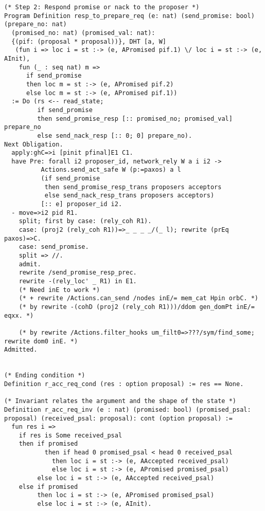 \begin{landscape}
\begin{multicols*}{2}
\begin{lstlisting}[style=SourceCodeListing]
(* Step 2: Respond promise or nack to the proposer *)
Program Definition resp_to_prepare_req (e: nat) (send_promise: bool) (prepare_no: nat)
  (promised_no: nat) (promised_val: nat):
  {(pif: (proposal * proposal))}, DHT [a, W]
   (fun i => loc i = st :-> (e, APromised pif.1) \/ loc i = st :-> (e, AInit),
    fun (_ : seq nat) m =>
      if send_promise
      then loc m = st :-> (e, APromised pif.2)
      else loc m = st :-> (e, APromised pif.1))
  := Do (rs <-- read_state;
         if send_promise
         then send_promise_resp [:: promised_no; promised_val] prepare_no
         else send_nack_resp [:: 0; 0] prepare_no).
Next Obligation.
  apply:ghC=>i [pinit pfinal]E1 C1.
  have Pre: forall i2 proposer_id, network_rely W a i i2 ->
          Actions.send_act_safe W (p:=paxos) a l
          (if send_promise
           then send_promise_resp_trans proposers acceptors
           else send_nack_resp_trans proposers acceptors)
          [:: e] proposer_id i2.
  - move=>i2 pid R1.
    split; first by case: (rely_coh R1).
    case: (proj2 (rely_coh R1))=>_ _ _ _/(_ l); rewrite (prEq paxos)=>C.
    case: send_promise.
    split => //.
    admit.
    rewrite /send_promise_resp_prec.
    rewrite -(rely_loc' _ R1) in E1.
    (* Need inE to work *)
    (* + rewrite /Actions.can_send /nodes inE/= mem_cat Hpin orbC. *)
    (* by rewrite -(cohD (proj2 (rely_coh R1)))/ddom gen_domPt inE/= eqxx. *)

    (* by rewrite /Actions.filter_hooks um_filt0=>???/sym/find_some; rewrite dom0 inE. *)
Admitted.


(* Ending condition *)
Definition r_acc_req_cond (res : option proposal) := res == None.

(* Invariant relates the argument and the shape of the state *)
Definition r_acc_req_inv (e : nat) (promised: bool) (promised_psal: proposal) (received_psal: proposal): cont (option proposal) :=
  fun res i =>
    if res is Some received_psal
    then if promised
           then if head 0 promised_psal < head 0 received_psal
             then loc i = st :-> (e, AAccepted received_psal)
             else loc i = st :-> (e, APromised promised_psal)
         else loc i = st :-> (e, AAccepted received_psal)
    else if promised
         then loc i = st :-> (e, APromised promised_psal)
         else loc i = st :-> (e, AInit).


\end{lstlisting}
\end{multicols*}
\end{landscape}
